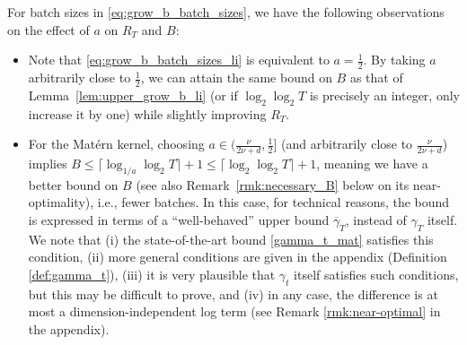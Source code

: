\documentclass[10pt]{article}
\begin{document}
\begin{remark}
    \label{rmk:choose_a_and_more}
    For batch sizes in \eqref{eq:grow_b_batch_sizes}, we have the following observations on the effect of $a$ on $R_T$ and $B$:
    \begin{itemize}
        \item Note that \eqref{eq:grow_b_batch_sizes_li} is equivalent to $a=\frac{1}{2}$.  
        By taking $a$ arbitrarily close to $\frac{1}{2}$, we can attain the same bound on $B$ as that of Lemma~\ref{lem:upper_grow_b_li} (or if $\log_2\log_2 T$ is precisely an integer, only increase it by one) while slightly improving $R_T$.
        \item For the Mat\'ern kernel, choosing $a\in(\frac{\nu}{2\nu+d},\frac{1}{2}]$ (and arbitrarily close to $\frac{\nu}{2\nu+d}$) implies $B \leq \lceil \log_{1/a}\log_2 T \rceil + 1 \leq \lceil \log_2\log_2 T \rceil + 1$, meaning we have a better bound on $B$ (see also Remark~\ref{rmk:necessary_B} below on its near-optimality), i.e., fewer batches. 
        In this case, for technical reasons, the bound is expressed in terms of a ``well-behaved'' upper bound $\overline{\gamma}_T$, instead of $\gamma_T$ itself.  We note that (i) the state-of-the-art bound \eqref{gamma_t_mat} satisfies this condition, (ii) more general conditions are given in the appendix (Definition \ref{def:gamma_t}), (iii) it is very plausible that $\gamma_t$ itself satisfies such conditions, but this may be difficult to prove, and (iv) in any case, the difference is at most a dimension-independent log term (see Remark \ref{rmk:near-optimal} in the appendix).
    \end{itemize}
    \end{remark}
    
\end{document}

